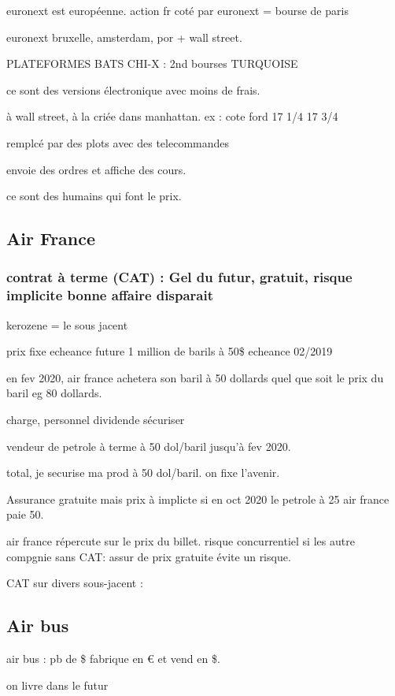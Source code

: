 \documentclass[a4paper,12pt]{article}
\begin{document}
euronext est européenne.
action fr coté par euronext = bourse de paris

euronext bruxelle, amsterdam, por + wall street.
 
 
 PLATEFORMES
 BATS
 CHI-X : 2nd bourses 
 TURQUOISE
 
 ce sont des versions électronique avec moins de frais.
 
 à wall street, à la criée dans manhattan.
 ex : cote ford 17 1/4  
 17 3/4
 
 remplcé par des plots avec des telecommandes
 
 envoie des ordres et affiche des cours.
 
 ce sont des humains qui font le prix.
 
 
 
 
\subsection{Air France}


\subsubsection{contrat à terme (CAT) : Gel du futur, gratuit, risque implicite bonne affaire disparait}
kerozene = le sous jacent

prix fixe echeance future
1 million de barils à 50\$  echeance 02/2019

en fev 2020, air france achetera son baril à 50 dollards quel que  soit le prix du baril eg 80 dollards.

charge, personnel dividende
sécuriser 

vendeur de petrole à terme à 50 dol/baril jusqu'à fev 2020.

total, je securise ma prod à 50 dol/baril. on fixe l'avenir.

Assurance gratuite mais prix à implicte si en oct 2020 le petrole à 25 air france paie 50.

air france répercute sur le prix du billet.
risque concurrentiel si les autre compgnie sans CAT: assur de prix gratuite évite un risque.

CAT sur divers sous-jacent :


\subsection{Air bus}
air bus : pb de \$  fabrique en € et vend en \$.

on livre dans le futur
\end{document}
